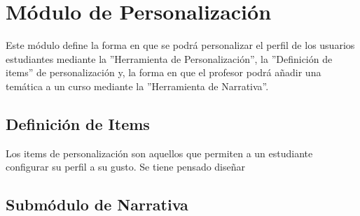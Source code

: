 \chapter{Módulo de Personalización}
\label{mod:personalizacion}

    Este módulo define la forma en que se podrá personalizar el perfil de los usuarios estudiantes mediante la ''Herramienta de Personalización'', la ''Definición de items'' de personalización y, la forma en que el profesor podrá añadir una temática a un curso mediante la ''Herramienta de Narrativa''.

\section{Definición de Items}

    Los items de personalización son aquellos que permiten a un estudiante configurar su perfil a su gusto. Se tiene pensado diseñar







\section{Submódulo de Narrativa}


